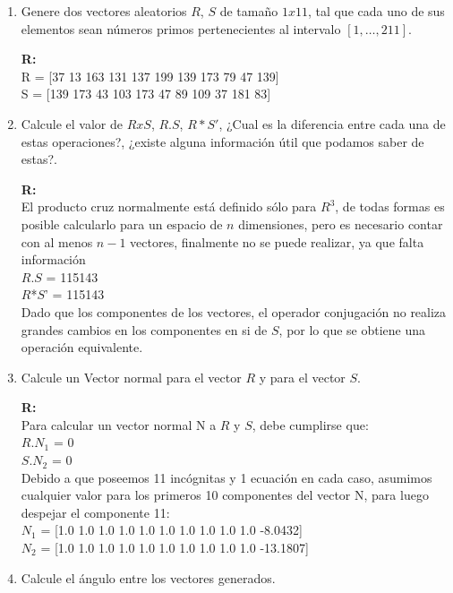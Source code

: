\begin{enumerate}
	\item Genere dos vectores aleatorios $R$, $S$ de tamaño $1x11$, tal que cada uno de sus elementos
		sean números primos pertenecientes al intervalo $[1,\ldots,211]$.

	\textbf{R:}\\

R = [37 13 163 131 137 199 139 173  79  47 139] \\
S = [139 173  43 103 173  47  89 109  37 181  83] \\
 
	\item Calcule el valor de $RxS$, $R.S$, $R*S'$, ¿Cual es la diferencia entre cada una de estas
operaciones?, ¿existe alguna información útil que podamos saber de estas?.

	\textbf{R:}\\

	El producto cruz normalmente está definido sólo para $R^3$,
	de todas formas es posible calcularlo para un espacio de $n$ dimensiones,
	pero es necesario contar con al menos $n-1$ vectores,
	finalmente no se puede realizar, ya que falta información\\

	$R$.$S$ = 115143 \\
	$R$*$S$' = 115143 \\

	Dado que los componentes de los vectores, el operador conjugación no realiza grandes cambios en los componentes en si de $S$, 
	por lo que se obtiene una operación equivalente.

	\item Calcule un Vector normal para el vector $R$ y para el vector $S$.

	\textbf{R:}\\

	Para calcular un vector normal N a $R$ y $S$, debe cumplirse que: \\

	$R$.$N_1$ = 0 \\
	$S$.$N_2$ = 0 \\

	Debido a que poseemos 11 incógnitas y 1 ecuación en cada caso, asumimos cualquier valor para los primeros 
	10 componentes del vector N, para luego despejar el componente 11: \\

	$N_1$ = [1.0 1.0 1.0 1.0 1.0 1.0 1.0 1.0 1.0 1.0 -8.0432] \\
	$N_2$ = [1.0  1.0  1.0  1.0  1.0  1.0  1.0  1.0  1.0  1.0 -13.1807] \\
	\newpage
	\item Calcule el ángulo entre los vectores generados.


\end{enumerate}
